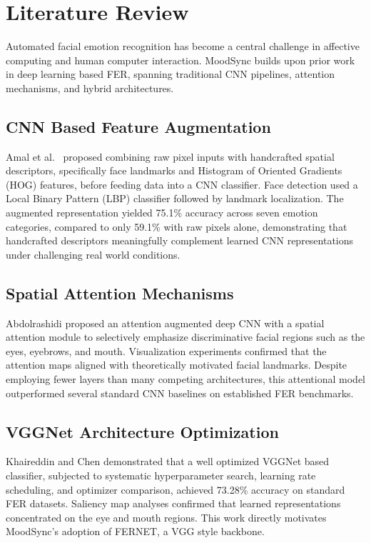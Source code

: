 \documentclass[conference]{IEEEtran}
\begin{document}
\section{Literature Review}

Automated facial emotion recognition has become a central challenge in
affective computing and human computer interaction. MoodSync builds upon
prior work in deep learning based FER, spanning traditional CNN pipelines,
attention mechanisms, and hybrid architectures.

\subsection{CNN Based Feature Augmentation}
Amal et al.\ \cite{b1} proposed combining raw pixel inputs with handcrafted
spatial descriptors, specifically face landmarks and Histogram of Oriented
Gradients (HOG) features, before feeding data into a CNN classifier. Face
detection used a Local Binary Pattern (LBP) classifier followed by landmark
localization. The augmented representation yielded 75.1\% accuracy across
seven emotion categories, compared to only 59.1\% with raw pixels alone,
demonstrating that handcrafted descriptors meaningfully complement learned
CNN representations under challenging real world conditions.

\subsection{Spatial Attention Mechanisms}
Abdolrashidi \cite{b2} proposed an attention augmented deep CNN with a
spatial attention module to selectively emphasize discriminative facial
regions such as the eyes, eyebrows, and mouth. Visualization experiments
confirmed that the attention maps aligned with theoretically motivated
facial landmarks. Despite employing fewer layers than many competing
architectures, this attentional model outperformed several standard CNN
baselines on established FER benchmarks.

\subsection{VGGNet Architecture Optimization}
Khaireddin and Chen \cite{b3} demonstrated that a well optimized VGGNet
based classifier, subjected to systematic hyperparameter search, learning
rate scheduling, and optimizer comparison, achieved 73.28\% accuracy on
standard FER datasets. Saliency map analyses confirmed that learned
representations concentrated on the eye and mouth regions. This work directly
motivates MoodSync's adoption of FERNET, a VGG style backbone.
\end{document}
